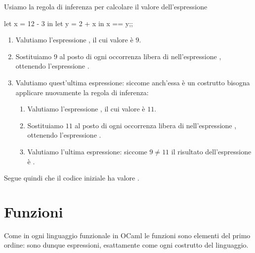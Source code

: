\begin{example}
    Usiamo la regola di inferenza per calcolare il valore dell'espressione
    \begin{OCaml}
        let x = 12 - 3 
            in let y = 2 + x 
                    in x == y;;
    \end{OCaml}

    \begin{enumerate}[label={(\arabic*)}]
        \item Valutiamo l'espressione , il cui valore è $9$.
        \item Sostituiamo $9$ al posto di ogni occorrenza libera di  nell'espressione , ottenendo l'espressione .
        \item Valutiamo quest'ultima espressione: siccome anch'essa è un costrutto  bisogna applicare nuovamente la regola di inferenza:
        \begin{enumerate}[label={(\roman*)}]
            \item Valutiamo l'espressione , il cui valore è $11$.
            \item Sostituiamo $11$ al posto di ogni occorrenza libera di  nell'espressione , ottenendo l'espressione .
            \item Valutiamo l'ultima espressione: siccome $9 \neq 11$ il risultato dell'espressione è .
        \end{enumerate}
    \end{enumerate}
    Segue quindi che il codice iniziale ha valore .
\end{example}

\section{Funzioni}

Come in ogni linguaggio funzionale in OCaml le funzioni sono elementi del primo ordine: sono dunque espressioni, esattamente come ogni costrutto del linguaggio.

